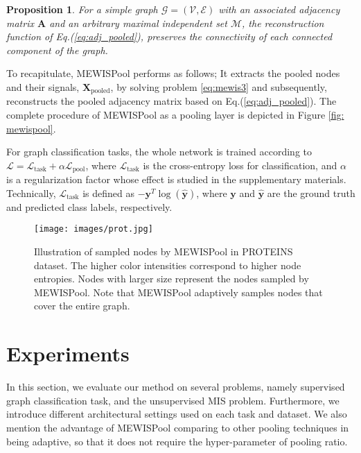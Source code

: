 \documentclass{article}
\newtheorem{prop}{Proposition}
\begin{document}
\begin{prop}\label{prop5}
	For a simple graph $\mathcal{G} = (\mathcal{V}, \mathcal{E})$ with an associated adjacency matrix $\mathbf{A}$ and an arbitrary maximal independent set $\mathcal{M}$, the reconstruction function of Eq.(\ref{eq:adj_pooled}), preserves the connectivity of each connected component of the graph.
\end{prop}
To recapitulate, MEWISPool performs as follows; It extracts the pooled nodes and their signals, $\mathbf{X}_{\textrm{pooled}}$, by solving problem \ref{eq:mewis3} and subsequently, reconstructs the pooled adjacency matrix based on Eq.(\ref{eq:adj_pooled}). The complete procedure of MEWISPool as a pooling layer is depicted in Figure \ref{fig: mewispool}.

For graph classification tasks, the whole network is trained according to $\mathcal{L}=\mathcal{L}_{\textrm{task}}+\alpha \mathcal{L}_{\textrm{pool}}$, where $\mathcal{L}_{\textrm{task}}$ is the cross-entropy loss for classification, and $\alpha$ is a regularization factor whose effect is studied in the supplementary materials. Technically, $\mathcal{L}_{\textrm{task}}$ is defined as $-\mathbf{y}^T\log (\mathbf{\hat{y}})$, where $\mathbf{y}$ and $\mathbf{\hat{y}}$ are the ground truth and predicted class labels, respectively.

\begin{figure*}[t]
	\vskip 0.2in
	\begin{center}
		\centerline{\texttt{[image: images/prot.jpg]}}
		\caption{\scriptsize Illustration of sampled nodes by MEWISPool in PROTEINS dataset\cite{dd1prot,enzprot}. The higher color intensities correspond to higher node entropies. Nodes with larger size represent the nodes sampled by MEWISPool. Note that MEWISPool adaptively samples nodes that cover the entire graph.}
		\label{fig:enz}
	\end{center}
	\vskip -0.2in
\end{figure*}

\section{Experiments}
\label{sec:experiments}
In this section, we evaluate our method on several problems, namely supervised graph classification task, and the unsupervised MIS problem. Furthermore, we introduce different architectural settings used on each task and dataset. We also mention the advantage of MEWISPool comparing to other pooling techniques in being adaptive, so that it does not require the hyper-parameter of pooling ratio.
\end{document}
